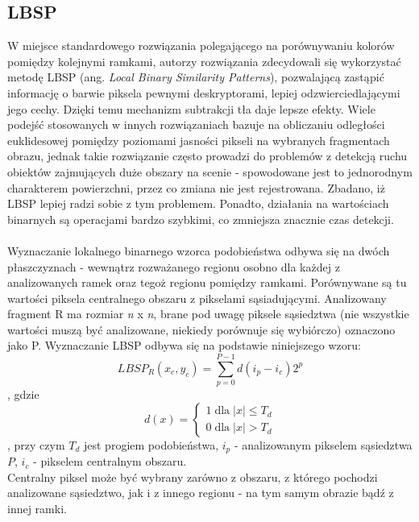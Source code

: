 \subsection{LBSP}
\label{sec:LBSP}
W miejsce standardowego rozwiązania polegającego na porównywaniu kolorów pomiędzy kolejnymi ramkami, autorzy rozwiązania zdecydowali się wykorzystać metodę LBSP \cite{bilodeau2013change} (ang. \textit{Local Binary Similarity Patterns}), pozwalającą zastąpić informację o barwie piksela pewnymi deskryptorami, lepiej odzwierciedlającymi jego cechy. Dzięki temu mechanizm subtrakcji tła daje lepsze efekty. Wiele podejść stosowanych w innych rozwiązaniach bazuje na obliczaniu odległości euklidesowej pomiędzy poziomami jasności pikseli na wybranych fragmentach obrazu, jednak takie rozwiązanie często prowadzi do problemów z detekcją ruchu obiektów zajmujących duże obszary na scenie - spowodowane jest to jednorodnym charakterem powierzchni, przez co zmiana nie jest rejestrowana. Zbadano, iż LBSP lepiej radzi sobie z tym problemem. Ponadto, działania na wartościach binarnych są operacjami bardzo szybkimi, co zmniejsza znacznie czas detekcji.
\paragraph{}
Wyznaczanie lokalnego binarnego wzorca podobieństwa odbywa się na dwóch płaszczyznach - wewnątrz rozważanego regionu osobno dla każdej z analizowanych ramek oraz tegoż regionu pomiędzy ramkami. Porównywane są tu wartości piksela centralnego obszaru z pikselami sąsiadującymi. Analizowany fragment R ma rozmiar \textit{n} x \textit{n}, brane pod uwagę piksele sąsiedztwa (nie wszystkie wartości muszą być analizowane, niekiedy porównuje się wybiórczo) oznaczono jako P. Wyznaczanie LBSP odbywa się na podstawie niniejszego wzoru:
\begin{equation}
LBSP_{R}(x_{c},y_{c}) = 
\sum_{p=0}^{P-1}d(i_{p}-i_{c})2^p
\end{equation},
gdzie
\begin{equation}
d(x)=\left\{\substack{
1 \; \mathrm{dla} \; |x|\leq T_{d} \\[0.5em]
0 \; \mathrm{dla} \; |x|>T_{d}}\right.
\end{equation}
, przy czym $T_{d}$ jest progiem podobieństwa, $i_{p}$ - analizowanym pikselem sąsiedztwa $P$, $i_{c}$ - pikselem centralnym obszaru.\\
Centralny piksel może być wybrany zarówno z obszaru, z którego pochodzi analizowane sąsiedztwo, jak i z innego regionu - na tym samym obrazie bądź z innej ramki.
